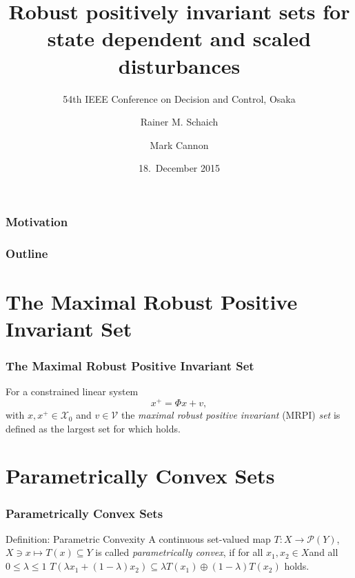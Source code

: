 \documentclass{beamer}
\title{Robust positively invariant sets for state dependent and scaled disturbances}
\subtitle{54th IEEE Conference on Decision and Control, Osaka}
\author{Rainer M. Schaich \and Mark Cannon}
\date{18.~December 2015}
\theoremstyle{plain}
\begin{document}
	{
		\begin{frame}
			\titlepage
		\end{frame}
	}


\begin{frame}
\frametitle{Motivation}
\end{frame}

\begin{frame}
\frametitle{Outline}
\tableofcontents
\end{frame}

\section{The Maximal Robust Positive Invariant Set}
\begin{frame}
\frametitle{The Maximal Robust Positive Invariant Set}
For a constrained linear system
\[
x^+ = \Phi x + v,
\]
with $x,x^+\in\mathcal X_0$ and $v\in\mathscr V$ the \emph{maximal robust positive invariant} 
(MRPI) \emph{set} is defined as the largest set for which
holds.
\end{frame}

\section{Parametrically Convex Sets}
\begin{frame}
\frametitle{Parametrically Convex Sets}
\begin{block}{Definition: Parametric Convexity}
A continuous set-valued map $T: X\rightarrow\mathcal P(Y)$, $X\ni x\mapsto T(x)\subseteq Y$ is called \emph{parametrically convex}, if for all $x_1,x_2\in X$and all $0\leq\lambda\leq1$ $T(\lambda x_1 + (1-\lambda)x_2)\subseteq \lambda T(x_1) \oplus (1-\lambda)T(x_2)$ holds.
\end{block}


\end{frame}
 
\end{document}
